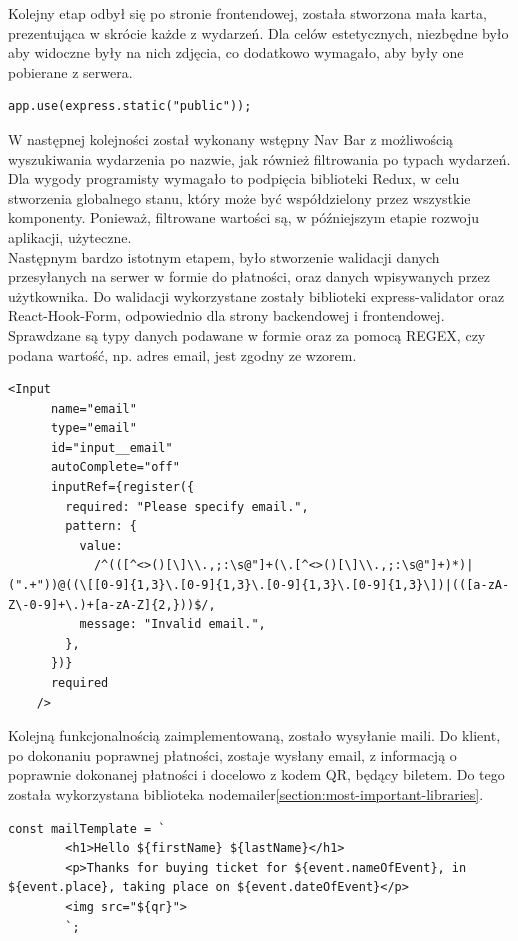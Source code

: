 \documentclass[12pt]{article}
\begin{document}
\begin{sloppypar}
{  Kolejny etap odbył się po stronie frontendowej, została stworzona mała karta, prezentująca w skrócie każde z wydarzeń. Dla celów estetycznych, niezbędne było 
  aby widoczne były na nich zdjęcia, co dodatkowo wymagało, aby były one pobierane z serwera.
  \begin{lstlisting}[caption={Linijka kodu odpowiadająca za podpięcie folderu public, w którym znajdują się zdjęcia wydarzeń.}, captionpos=b]
    app.use(express.static("public"));
  \end{lstlisting}
  W następnej kolejności został wykonany wstępny Nav Bar z możliwością wyszukiwania wydarzenia po nazwie, jak również filtrowania po typach wydarzeń. Dla wygody 
  programisty wymagało to podpięcia biblioteki Redux, w celu stworzenia globalnego stanu, który może być współdzielony przez wszystkie komponenty. 
  Ponieważ, filtrowane wartości są, w późniejszym etapie rozwoju aplikacji, użyteczne.\\
  Następnym bardzo istotnym etapem, było stworzenie walidacji danych przesyłanych na serwer w formie do płatności, oraz danych wpisywanych przez użytkownika.
  Do walidacji wykorzystane zostały biblioteki express-validator oraz React-Hook-Form, odpowiednio dla strony backendowej i frontendowej. 
  Sprawdzane są typy danych podawane w formie oraz za pomocą REGEX, czy podana wartość, np. adres email, jest zgodny ze wzorem.
  \begin{lstlisting}[caption={Przykładowy pattern walidacji emaila, po stronie klienta.}, captionpos=b]
    <Input
      name="email"
      type="email"
      id="input__email"
      autoComplete="off"
      inputRef={register({
        required: "Please specify email.",
        pattern: {
          value:
            /^(([^<>()[\]\\.,;:\s@"]+(\.[^<>()[\]\\.,;:\s@"]+)*)|(".+"))@((\[[0-9]{1,3}\.[0-9]{1,3}\.[0-9]{1,3}\.[0-9]{1,3}\])|(([a-zA-Z\-0-9]+\.)+[a-zA-Z]{2,}))$/,
          message: "Invalid email.",
        },
      })}
      required
    />
  \end{lstlisting}
  Kolejną funkcjonalnością zaimplementowaną, zostało wysyłanie maili. 
  Do klient, po dokonaniu poprawnej płatności, zostaje wysłany email, z informacją o poprawnie dokonanej płatności i docelowo z kodem QR, będący biletem.
  Do tego została wykorzystana biblioteka nodemailer\ref{section:most-important-libraries}.
  \begin{lstlisting}[caption=Kod odpowiadający za wysyłanie emaili., captionpos=b]
    const mailTemplate = `
        <h1>Hello ${firstName} ${lastName}</h1>
        <p>Thanks for buying ticket for ${event.nameOfEvent}, in ${event.place}, taking place on ${event.dateOfEvent}</p>
        <img src="${qr}">
        `;


\end{lstlisting}}
\end{sloppypar}
\end{document}
